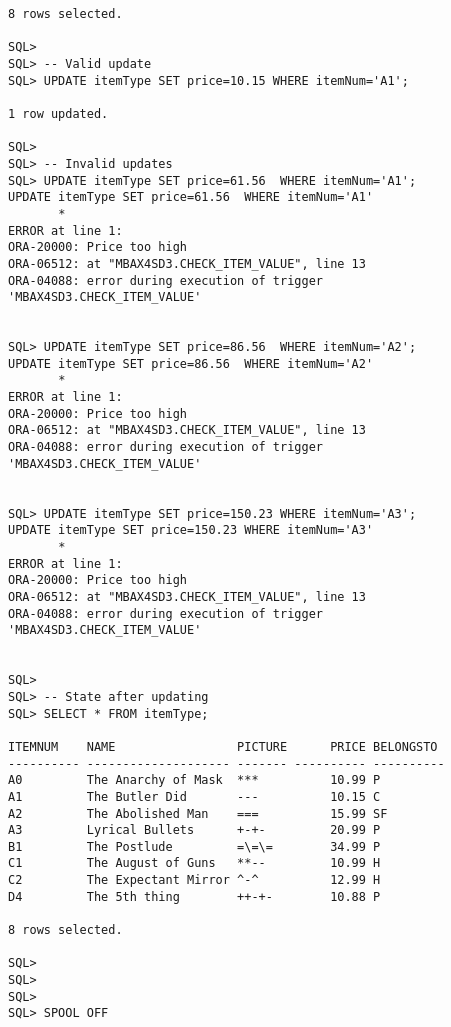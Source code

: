 \documentclass{article}
\begin{document}
\begin{lstlisting}
8 rows selected.

SQL> 
SQL> -- Valid update
SQL> UPDATE itemType SET price=10.15 WHERE itemNum='A1';

1 row updated.

SQL> 
SQL> -- Invalid updates
SQL> UPDATE itemType SET price=61.56  WHERE itemNum='A1';
UPDATE itemType SET price=61.56  WHERE itemNum='A1'
       *
ERROR at line 1:
ORA-20000: Price too high 
ORA-06512: at "MBAX4SD3.CHECK_ITEM_VALUE", line 13 
ORA-04088: error during execution of trigger 'MBAX4SD3.CHECK_ITEM_VALUE' 


SQL> UPDATE itemType SET price=86.56  WHERE itemNum='A2';
UPDATE itemType SET price=86.56  WHERE itemNum='A2'
       *
ERROR at line 1:
ORA-20000: Price too high 
ORA-06512: at "MBAX4SD3.CHECK_ITEM_VALUE", line 13 
ORA-04088: error during execution of trigger 'MBAX4SD3.CHECK_ITEM_VALUE' 


SQL> UPDATE itemType SET price=150.23 WHERE itemNum='A3';
UPDATE itemType SET price=150.23 WHERE itemNum='A3'
       *
ERROR at line 1:
ORA-20000: Price too high 
ORA-06512: at "MBAX4SD3.CHECK_ITEM_VALUE", line 13 
ORA-04088: error during execution of trigger 'MBAX4SD3.CHECK_ITEM_VALUE' 


SQL> 
SQL> -- State after updating
SQL> SELECT * FROM itemType;

ITEMNUM    NAME                 PICTURE      PRICE BELONGSTO                    
---------- -------------------- ------- ---------- ----------                   
A0         The Anarchy of Mask  ***          10.99 P                            
A1         The Butler Did       ---          10.15 C                            
A2         The Abolished Man    ===          15.99 SF                           
A3         Lyrical Bullets      +-+-         20.99 P                            
B1         The Postlude         =\=\=        34.99 P                            
C1         The August of Guns   **--         10.99 H                            
C2         The Expectant Mirror ^-^          12.99 H                            
D4         The 5th thing        ++-+-        10.88 P                            

8 rows selected.

SQL> 
SQL> 
SQL> 
SQL> SPOOL OFF

\end{lstlisting}
\end{document}
